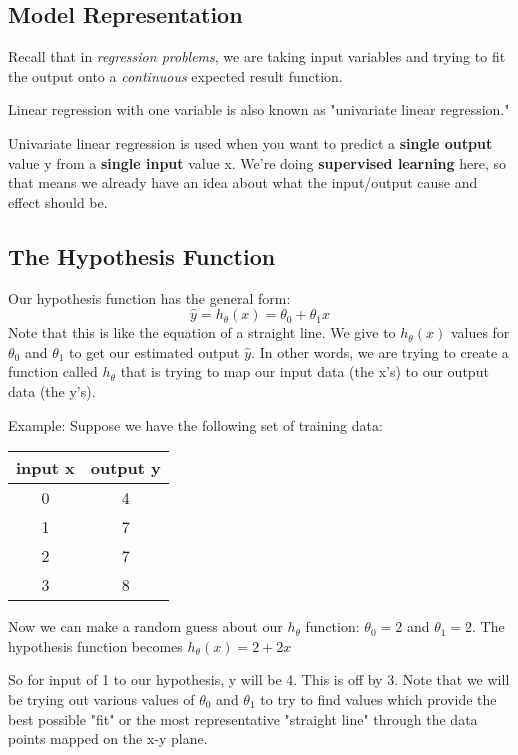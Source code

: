 \documentclass{article}
\begin{document}
\subsection{Model Representation}
Recall that in \textit{regression problems}, we are taking input variables and trying to fit the output onto a \textit{continuous} expected result function.

Linear regression with one variable is also known as "univariate linear regression."

Univariate linear regression is used when you want to predict a \textbf{single output} value y from a \textbf{single input} value x. We're doing \textbf{supervised learning} here, so that means we already have an idea about what the input/output cause and effect should be.
\subsection{The Hypothesis Function}
Our hypothesis function has the general form:
$$\hat{y} = h_\theta(x) = \theta_0 + \theta_1 x$$
Note that this is like the equation of a straight line. We give to $h_\theta(x)$ values for $\theta_0$ and $\theta_1$ to get our estimated output $\hat{y}$. In other words, we are trying to create a function called $h_\theta$ that is trying to map our input data (the x's) to our output data (the y's).

Example:
Suppose we have the following set of training data:
\begin{center}
\begin{tabular}{ |c|c| } 
 \hline
 \textbf{input x} & \textbf{output y} \\ 
 \hline
 0 & 4 \\ 
 1 & 7 \\ 
 2 & 7 \\ 
 3 & 8 \\ 
 
 \hline
\end{tabular}
\end{center}

Now we can make a random guess about our $h_\theta$ function: $\theta_0 = 2$ and $\theta_1 = 2$. The hypothesis function becomes $h_\theta(x)=2+2x$

So for input of 1 to our hypothesis, y will be 4. This is off by 3. Note that we will be trying out various values of $\theta_0$ and $\theta_1$ to try to find values which provide the best possible "fit" or the most representative "straight line" through the data points mapped on the x-y plane.
\end{document}
